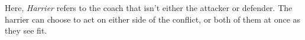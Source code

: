 \begin{note}
Here, \textit{Harrier} refers to the coach that isn't either the attacker or defender. 
The harrier can choose to act on either side of the conflict, or both of them at once as they see fit.
\end{note}

